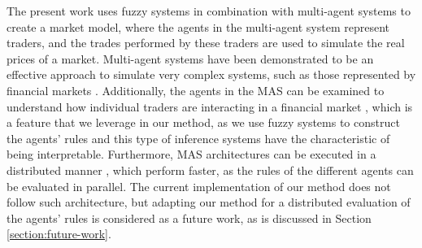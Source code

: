 \documentclass{ieeeaccess}
\begin{document}
The present work uses fuzzy systems in combination with multi-agent
systems to create a market model, where the agents in the
multi-agent system represent traders, and the trades performed by
these traders are used to simulate the real prices of a market.
Multi-agent systems have been demonstrated to be an effective
approach to simulate very complex systems, such as those represented
by financial markets \cite{Lebaron2001} \cite{Grothmann2002,Li2014,Chen2004,Kim2018}.
Additionally, the agents in the MAS can be examined to understand how individual traders are
interacting in a financial market \cite{Wei2014} \cite{Rajab2019},
which is a feature that we leverage in our method, as we use fuzzy
systems to construct the agents' rules and this type of inference
systems have the characteristic of being interpretable. %
Furthermore, MAS architectures can be executed in a distributed manner
\cite{Gao2019} \cite{Yu2015} \cite{Yu2015}, which perform faster, as the rules
of the different agents can be evaluated in parallel. The current
implementation of our method does not follow such architecture, but
adapting our method for a distributed evaluation of the agents' rules
is considered as a future work, as is discussed in Section
\ref{section:future-work}.
\end{document}
